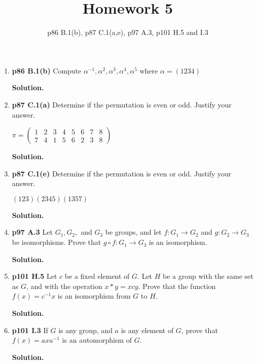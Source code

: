 \documentclass[11pt]{article}
\begin{document}
\title{Homework 5}
\date{p86 B.1(b), p87 C.1(a,e), p97 A.3, p101 H.5 and I.3}
\maketitle

\thispagestyle{fancy}  
\pagestyle{fancy}      

\begin{enumerate}

\item {\bfseries p86 B.1(b)} Compute $\alpha^{-1}, \alpha^2, \alpha^3, \alpha^4, \alpha^5$ where $\alpha = (1234)$
  
	{\bfseries Solution.}

\item {\bfseries p87 C.1(a)} Determine if the permutation is even or odd. Justify your answer.
	
	$\pi = \begin{pmatrix}
		1 & 2 & 3 & 4 & 5 & 6 & 7 & 8 \\
		7 & 4 & 1 & 5 & 6 & 2 & 3 & 8
	\end{pmatrix}$
  
	{\bfseries Solution.}

\item {\bfseries p87 C.1(e)} Determine if the permutation is even or odd. Justify your answer.

	$(123)(2345)(1357)$
  
	{\bfseries Solution.}
  
\newpage

\item {\bfseries p97 A.3} Let $G_1, G_2,$ and $G_3$ be groups, and let $f : G_1 \rightarrow G_2$ and $g : G_2 \rightarrow G_3$ be isomorphisms. Prove that $g \circ f : G_1 \rightarrow G_3$ is an isomorphism.
  
	{\bfseries Solution.}

\item {\bfseries p101 H.5} Let $c$ be a fixed element of $G$. Let $H$ be a group with the same set as $G$, and with the operation $x * y = xcy$. Prove that the function $f(x) = c^{-1}x$ is an isomorphism from $G$ to $H$.
  
	{\bfseries Solution.}

\item {\bfseries p101 I.3} If $G$ is any group, and $a$ is any element of $G$, prove that $f(x) = axa^{-1}$ is an automorphism of $G$.
  
	{\bfseries Solution.}

\end{enumerate}
\end{document}
